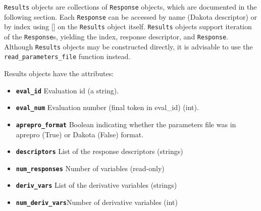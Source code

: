 {\tt Results} objects are collections of {\tt Response} objects, which are documented in the following section. Each {\tt Response} can be accessed by name (Dakota descriptor) or by index using {[}{]} on the {\tt Results} object itself. {\tt Results} objects support iteration of the {\tt Response}s, yielding the index, response descriptor, and {\tt Response}. Although {\tt Results} objects may be constructed directly, it is advisable to use the {\tt read\_parameters\_file} function instead.

Results objects have the attributes:

\begin{itemize}

  \item{} \label{index:dakota.interfacing.Results.eval_id}\textbf{\texttt{eval\_id}} Evaluation id (a string).

  \item{} \label{index:dakota.interfacing.Results.eval_num}\textbf{\texttt{eval\_num}} Evaluation number (final token in eval\_id) (int).

  \item{} \label{index:dakota.interfacing.Results.aprepro_format}\textbf{\texttt{aprepro\_format}} Boolean indicating whether the parameters file was in
aprepro (True) or Dakota (False) format.

  \item{} \label{index:dakota.interfacing.Results.descriptors}\textbf{\texttt{descriptors}} List of the response descriptors (strings)

  \item{}  \label{index:dakota.interfacing.Results.num_responses}\textbf{\texttt{num\_responses}} Number of variables (read-only)

  \item{} \label{index:dakota.interfacing.Results.deriv_vars}\textbf{\texttt{deriv\_vars}} List of the derivative variables (strings)

  \item{}\label{index:dakota.interfacing.Results.num_deriv_vars}\textbf{\texttt{num\_deriv\_vars}}Number of derivative variables (int)

\end{itemize}

